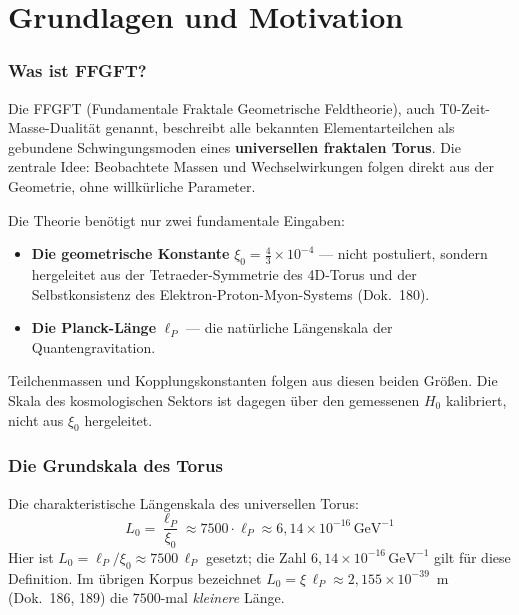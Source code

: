 
\part{Grundlagen und Motivation}

\section{Was ist FFGFT?}

Die FFGFT (Fundamentale Fraktale Geometrische Feldtheorie), auch
T0-Zeit-Masse-Dualität genannt, beschreibt alle bekannten Elementarteilchen
als gebundene Schwingungsmoden eines \textbf{universellen fraktalen Torus}.
Die zentrale Idee: Beobachtete Massen und Wechselwirkungen folgen direkt
aus der Geometrie, ohne willkürliche Parameter.

Die Theorie benötigt nur zwei fundamentale Eingaben:

\begin{itemize}
  \item \textbf{Die geometrische Konstante}
    $\xi_0 = \frac{4}{3}\times 10^{-4}$ — nicht postuliert, sondern
    hergeleitet aus der Tetraeder-Symmetrie des 4D-Torus und der
    Selbstkonsistenz des Elektron-Proton-Myon-Systems (Dok.~180).
  \item \textbf{Die Planck-Länge} $\ell_P$ — die natürliche Längenskala
    der Quantengravitation.
\end{itemize}

Teilchenmassen und Kopplungskonstanten folgen aus diesen beiden Größen.
Die Skala des kosmologischen Sektors ist dagegen über den gemessenen
$H_0$ kalibriert, nicht aus $\xi_0$ hergeleitet.

\section{Die Grundskala des Torus}

Die charakteristische Längenskala des universellen Torus:
\begin{equation}
  L_0 = \frac{\ell_P}{\xi_0}
  \approx 7500 \cdot \ell_P
  \approx 6{,}14 \times 10^{-16}\,\text{GeV}^{-1}
\end{equation}
Hier ist $L_0 = \ell_P/\xi_0 \approx 7500\,\ell_P$ gesetzt; die Zahl $6{,}14 \times 10^{-16}\,\text{GeV}^{-1}$ gilt für diese Definition. Im übrigen Korpus bezeichnet $L_0 = \xi\,\ell_P \approx 2{,}155 \times 10^{-39}$~m (Dok.~186, 189) die $7500$-mal \emph{kleinere} Länge.

